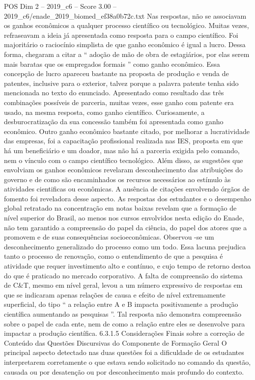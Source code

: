 \begin{textsample}{POS Dim 2 – 2019\_c6 – Score 3.00 – 2019\_c6/enade\_2019\_biomed\_ef38a0b72c.txt}
Nas respostas, não se associavam os ganhos econômicos a qualquer processo científico ou tecnológico.
Muitas vezes, refraseavam a ideia já apresentada como resposta para o campo científico.
Foi majoritário o raciocínio simplista de que ganho econômico é igual a lucro.
Dessa forma, chegaram a citar a “ adoção de mão de obra de estagiários, por elas serem mais baratas que os empregados formais ” como ganho econômico.
Essa concepção de lucro apareceu bastante na proposta de produção e venda de patentes, inclusive para o exterior, talvez porque a palavra patente tenha sido mencionada no texto do enunciado.
Apresentado como resultado das três combinações possíveis de parceria, muitas vezes, esse ganho com patente era usado, na mesma resposta, como ganho científico.
Curiosamente, a desburocratização da sua concessão também foi apresentada como ganho econômico.
Outro ganho econômico bastante citado, por melhorar a lucratividade das empresas, foi a capacitação profissional realizada nas IES, proposta em que há um beneficiário e um doador, mas não há a parceria exigida pelo comando, nem o vínculo com o campo científico tecnológico.
Além disso, as sugestões que envolviam os ganhos econômicos revelaram desconhecimento das atribuições do governo e de como são encaminhados os recursos necessários ao estímulo às atividades cientificas ou econômicas.
A ausência de citações envolvendo órgãos de fomento foi reveladora desse aspecto.
As respostas dos estudantes e o desempenho global retratado na concentração em notas baixas revelam que a formação de nível superior do Brasil, ao menos nos cursos envolvidos nesta edição do Enade, não tem garantido a compreensão do papel da ciência, do papel dos atores que a promovem e de suas consequências socioeconômicas.
Observou -se um desconhecimento generalizado do processo como um todo.
Essa lacuna prejudica tanto o processo de renovação, como o entendimento de que a pesquisa é atividade que requer investimento alto e contínuo, e cujo tempo de retorno destoa do que é praticado no mercado corporativo.
A falta de compreensão do sistema de C\&T, mesmo em nível geral, levou a um número expressivo de respostas em que se indicaram apenas relações de causa e efeito de nível extremamente superficial, do tipo “ a relação entre A e B impacta positivamente a produção científica aumentando as pesquisas ”.
Tal resposta não demonstra compreensão sobre o papel de cada ente, nem de como a relação entre eles se desenvolve para impactar a produção científica. 6.3.1.5 Considerações Finais sobre a correção de Conteúdo das Questões Discursivas do Componente de Formação Geral O principal aspecto detectado nas duas questões foi a dificuldade de os estudantes interpretarem corretamente o que estava sendo solicitado no comando da questão, causada ou por desatenção ou por desconhecimento mais profundo do contexto.

\end{textsample}
